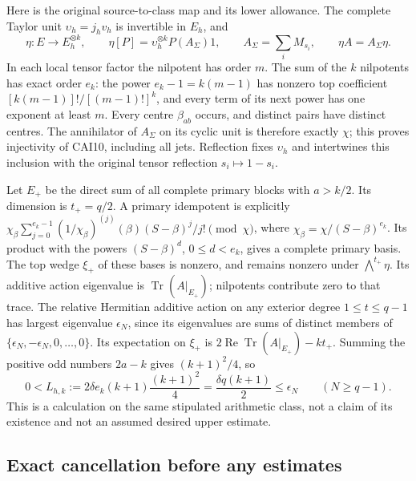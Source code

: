 Here is the original source-to-class map and its lower allowance. The
complete Taylor unit $\upsilon_h=j_hv_h$ is invertible in $E_h$, and
\[
 \eta:E\longrightarrow E_h^{\otimes k},\qquad
 \eta[P]=\upsilon_h^{\otimes k}P(A_\Sigma)1,\qquad
 A_\Sigma=\sum_iM_{s_i},\qquad \eta A=A_\Sigma\eta.\tag{CAI10}
\]
In each local tensor factor the nilpotent has order $m$. The sum of the
$k$ nilpotents has exact order $e_k$: the power $e_k-1=k(m-1)$ has
nonzero top coefficient $[k(m-1)]!/[(m-1)!]^k$, and every term of its
next power has one exponent at least $m$. Every centre $\beta_{ab}$
occurs, and distinct pairs have distinct centres. The annihilator of
$A_\Sigma$ on its cyclic unit is therefore exactly $\chi$; this proves
injectivity of CAI10, including all jets. Reflection fixes
$\upsilon_h$ and intertwines this inclusion with the original tensor
reflection $s_i\mapsto1-s_i$.

Let $E_+$ be the direct sum of all complete primary blocks with $a>k/2$.
Its dimension is $t_+=q/2$. A primary idempotent is explicitly
$\chi_\beta\sum_{j=0}^{e_k-1}(1/\chi_\beta)^{(j)}(\beta)
(S-\beta)^j/j!\pmod\chi$, where $\chi_\beta=\chi/(S-\beta)^{e_k}$.
Its product with the powers $(S-\beta)^d$, $0\le d<e_k$, gives a
complete primary basis. The top wedge $\xi_+$ of these bases is nonzero,
and remains nonzero under $\bigwedge^{t_+}\eta$. Its additive action
eigenvalue is $\operatorname{Tr}(A|_{E_+})$; nilpotents contribute zero
to that trace. The relative Hermitian additive action on any exterior
degree $1\le t\le q-1$ has largest eigenvalue $\epsilon_N$, since its
eigenvalues are sums of distinct members of
$\{\epsilon_N,-\epsilon_N,0,\ldots,0\}$. Its expectation on $\xi_+$
is $2\operatorname{Re}\operatorname{Tr}(A|_{E_+})-kt_+$. Summing the
positive odd numbers $2a-k$ gives $(k+1)^2/4$, so
\[
 0<L_{h,k}:=2\delta e_k(k+1)\frac{(k+1)^2}{4}
          =\frac{\delta q(k+1)}2\le\epsilon_N
          \qquad(N\ge q-1).\tag{CAI11}
\]
This is a calculation on the same stipulated arithmetic class, not a
claim of its existence and not an assumed desired upper estimate.

\subsection{Exact cancellation before any estimates}

